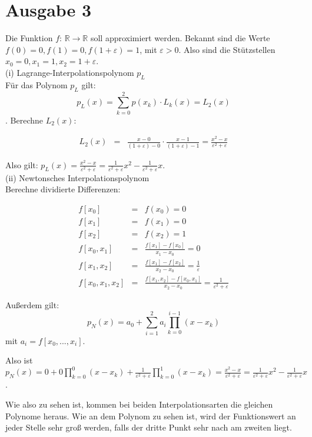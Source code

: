 \documentclass[11pt,a4paper,ngerman]{article}
\begin{document}
\section*{Ausgabe 3}
Die Funktion $f: \, \mathbb{R} \to \mathbb{R}$ soll approximiert werden. Bekannt sind die Werte $f(0) = 0, f(1) = 0, f(1 + \varepsilon) = 1$, mit $\varepsilon > 0$. Also sind die Stützstellen $x_0 = 0, x_1 = 1, x_2 = 1 + \varepsilon$.\\

(i) Lagrange-Interpolationspolynom $p_L$\\

Für das Polynom $p_L$ gilt:
$$ p_L(x) = \sum_{k=0}^{2}{p(x_k) \cdot L_k(x)} = L_2(x) $$.
Berechne $L_2(x)$:

\begin{eqnarray*}
L_2(x) &=& \frac{x-0}{(1+\varepsilon)-0} \cdot \frac{x-1}{(1+\varepsilon) - 1} = \frac{x^2-x}{\varepsilon^2 + \varepsilon}
\end{eqnarray*}

Also gilt:
$ p_L(x) = \frac{x^2-x}{\varepsilon^2 + \varepsilon} = \frac{1}{\varepsilon^2 + \varepsilon}x^2 - \frac{1}{\varepsilon^2 + \varepsilon}x$.
\\
(ii) Newtonsches Interpolationspolynom \\

Berechne dividierte Differenzen:

\begin{eqnarray*}
f[x_0] &=& f(x_0) = 0 \\
f[x_1] &=& f(x_1) = 0 \\
f[x_2] &=& f(x_2) = 1 \\
f[x_0,x_1] &=& \frac{f[x_1] - f[x_0]}{x_1 - x_0} = 0 \\
f[x_1,x_2] &=& \frac{f[x_1] - f[x_2]}{x_2 - x_0} = \frac{1}{\varepsilon} \\
f[x_0,x_1,x_2] &=& \frac{f[x_1,x_2] - f[x_0,x_1]}{x_2 - x_0} = \frac{1}{\varepsilon^2 + \varepsilon}
\end{eqnarray*}

Außerdem gilt:
$$ p_N(x) = a_0 + \sum_{i=1}^{2}{a_i \prod_{k=0}^{i-1}{(x-x_k)}} $$
mit $a_i = f[x_0,...,x_i]$.

Also ist 
$p_N(x) = 0 + 0 \prod_{k=0}^{0}{(x-x_k)} + \frac{1}{\varepsilon^2 + \varepsilon} \prod_{k=0}^{1}{(x-x_k)} = \frac{x^2-x}{\varepsilon^2 + \varepsilon}  = \frac{1}{\varepsilon^2 + \varepsilon}x^2 - \frac{1}{\varepsilon^2 + \varepsilon}x$.

Wie also zu sehen ist, kommen bei beiden Interpolationsarten die gleichen Polynome heraus. Wie an dem Polynom zu sehen ist, wird der Funktionswert an jeder Stelle sehr groß werden, falls der dritte Punkt sehr nach am zweiten liegt.
\label{LastPage}
\end{document}
